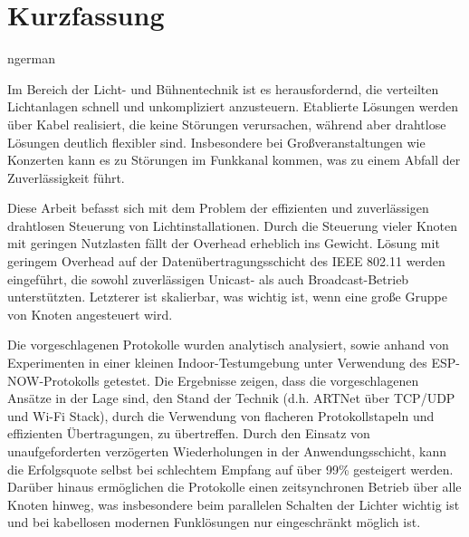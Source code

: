 \documentclass[]{ccs-thesis}
\begin{document}
\chapter*{Kurzfassung}
\begin{otherlanguage*}{ngerman}

Im Bereich der Licht- und Bühnentechnik ist es herausfordernd, 
die verteilten Lichtanlagen schnell und unkompliziert anzusteuern.
Etablierte Lösungen werden über Kabel realisiert, die keine Störungen verursachen,
während aber drahtlose Lösungen deutlich flexibler sind.
Insbesondere bei Großveranstaltungen wie Konzerten kann es zu Störungen im Funkkanal kommen,
was zu einem Abfall der Zuverlässigkeit führt.

Diese Arbeit befasst sich mit dem Problem der effizienten und zuverlässigen drahtlosen Steuerung von Lichtinstallationen.
Durch die Steuerung vieler Knoten mit geringen Nutzlasten fällt der Overhead erheblich ins Gewicht.
Lösung mit geringem Overhead auf der Datenübertragungsschicht des IEEE 802.11 werden eingeführt,
die sowohl zuverlässigen Unicast- als auch Broadcast-Betrieb unterstützten.
Letzterer ist skalierbar, was wichtig ist, wenn eine große Gruppe von Knoten angesteuert wird.

Die vorgeschlagenen Protokolle wurden analytisch analysiert,
sowie anhand von Experimenten in einer kleinen Indoor-Testumgebung unter Verwendung des ESP-NOW-Protokolls getestet.
Die Ergebnisse zeigen, dass die vorgeschlagenen Ansätze in der Lage sind, 
den Stand der Technik (d.h. ARTNet über TCP/UDP und Wi-Fi Stack),
durch die Verwendung von flacheren Protokollstapeln und effizienten Übertragungen, zu übertreffen.
Durch den Einsatz von unaufgeforderten verzögerten Wiederholungen in der Anwendungsschicht,
kann die Erfolgsquote selbst bei schlechtem Empfang auf über 99\% gesteigert werden.
Darüber hinaus ermöglichen die Protokolle einen zeitsynchronen Betrieb über alle Knoten hinweg,
was insbesondere beim parallelen Schalten der Lichter wichtig ist 
und bei kabellosen modernen Funklösungen nur eingeschränkt möglich ist. 

\end{otherlanguage*}
\acresetall

\cleardoublepage
\tableofcontents

\cleardoublepage
{}












% 

\cleardoublepage

\listofabbreviations
\clearpage

\listoffigures
\clearpage

\listoftables
\clearpage

\lstlistoflistings
\clearpage

\printbibliography
\end{document}
